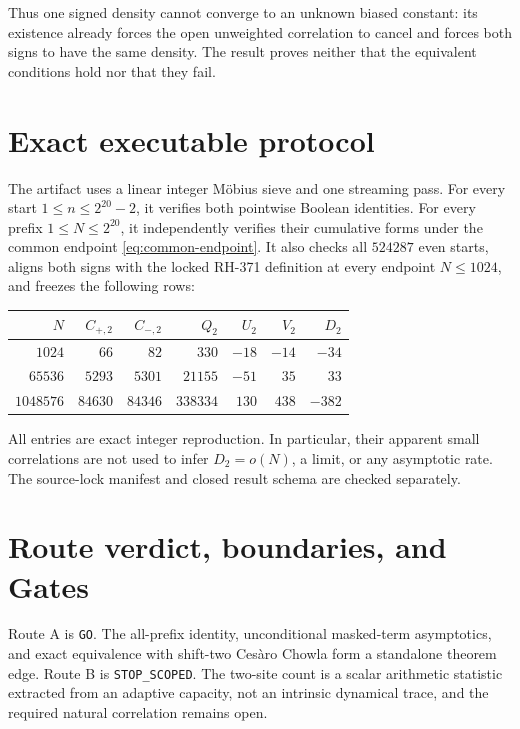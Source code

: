 \documentclass[11pt]{article}
\theoremstyle{definition}
\theoremstyle{remark}
\begin{document}
Thus one signed density cannot converge to an unknown biased constant: its
existence already forces the open unweighted correlation to cancel and
forces both signs to have the same density.  The result proves neither that
the equivalent conditions hold nor that they fail.

\section{Exact executable protocol}

The artifact uses a linear integer M\"obius sieve and one streaming pass.
For every start $1\le n\le2^{20}-2$, it verifies both pointwise Boolean
identities.  For every prefix $1\le N\le2^{20}$, it independently verifies
their cumulative forms under the common endpoint
\eqref{eq:common-endpoint}.  It also checks all $524287$ even starts, aligns
both signs with the locked RH-371 definition at every endpoint
$N\le1024$, and freezes the following rows:
\begin{center}
\small
\begin{tabular}{@{}rrrrrrr@{}}
\toprule
$N$ & $C_{+,2}$ & $C_{-,2}$ & $Q_2$ & $U_2$ & $V_2$ & $D_2$\\
\midrule
$1024$ & $66$ & $82$ & $330$ & $-18$ & $-14$ & $-34$\\
$65536$ & $5293$ & $5301$ & $21155$ & $-51$ & $35$ & $33$\\
$1048576$ & $84630$ & $84346$ & $338334$ & $130$ & $438$ & $-382$\\
\bottomrule
\end{tabular}
\end{center}
All entries are exact integer reproduction.  In particular, their apparent
small correlations are not used to infer $D_2=o(N)$, a limit, or any
asymptotic rate.  The source-lock manifest and closed result schema are
checked separately.

\section{Route verdict, boundaries, and Gates}

Route A is \texttt{GO}.  The all-prefix identity, unconditional masked-term
asymptotics, and exact equivalence with shift-two Ces\`aro Chowla form a
standalone theorem edge.  Route B is \texttt{STOP\_SCOPED}.  The two-site
count is a scalar arithmetic statistic extracted from an adaptive capacity,
not an intrinsic dynamical trace, and the required natural correlation remains
open.
\end{document}
